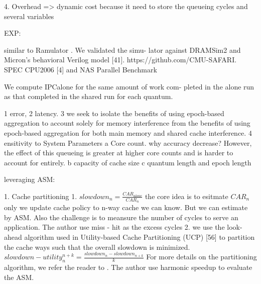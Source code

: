 \documentclass[UTF8]{article}
\begin{document}
    4. Overhead => dynamic cost because it need to store the queueing cycles and several variables
    
    EXP:
    
    similar to Ramulator \cite{kim2015ramulator}. We validated the simu- lator against DRAMSim2 \cite{rosenfeld2011dramsim2} and Micron’s behavioral Verilog model [41]. https://github.com/CMU-SAFARI. SPEC CPU2006 [4] and NAS Parallel Benchmark
    
    We compute IPCalone for the same amount of work com- pleted in the alone run as that completed in the shared run for each quantum.
    
    1 error,  2 latency. 3 we seek to isolate the benefits of using epoch-based aggregation to account solely for memory interference from the benefits of using epoch-based aggregation for both main memory and shared cache interference. 4 ensitivity to System Parameters a Core count. why accuracy decrease? However, the effect of this queueing is greater at higher core counts and is harder to account for entirely. b capacity of cache size c quantum length and epoch length
    
    leveraging ASM:
    
    1. Cache partitioning 1. $slowdown_n = \frac{CAR_{alone}}{CAR_n}$  the core idea is to esitmate $CAR_n$ only we update cache policy to n-way cache we can know. But we can estimate by ASM. Also the challenge is to meansure the number of cycles to serve an application. The author use miss - hit as the excess cycles 2. we use the look-ahead algorithm used in Utility-based Cache Partitioning (UCP) [56] to partition the cache ways such that the overall slowdown is minimized. $slowdown-utility^{n+k}_n = \frac{slowdown_n - slowdown_{n+k}}{k}$  For more details on the partitioning algorithm, we refer the reader to \cite{qureshi2006utility}. The author use harmonic speedup to evaluate the ASM.
    
\end{document}

